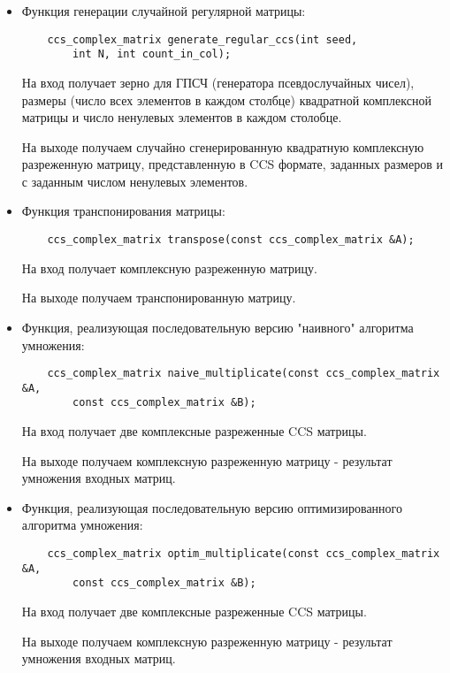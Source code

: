 \documentclass{report}
\begin{document}
		\begin{itemize}
			\item Функция генерации случайной регулярной матрицы:
			\begin{lstlisting}
    ccs_complex_matrix generate_regular_ccs(int seed, 
        int N, int count_in_col);
			\end{lstlisting}
			\par На вход получает зерно для ГПСЧ (генератора псевдослучайных чисел), размеры (число всех элементов в каждом столбце) квадратной комплексной матрицы и число ненулевых элементов в каждом столобце.
			\par На выходе получаем случайно сгенерированную квадратную комплексную разреженную матрицу, представленную в CCS формате, заданных размеров и с заданным числом ненулевых элементов.

			\item Функция транспонирования матрицы:
			\begin{lstlisting}
	ccs_complex_matrix transpose(const ccs_complex_matrix &A);
			\end{lstlisting}
			\par На вход получает комплексную разреженную матрицу.
			\par На выходе получаем транспонированную матрицу.

			\item Функция, реализующая последовательную версию "наивного"{} алгоритма умножения:
			\begin{lstlisting}
	ccs_complex_matrix naive_multiplicate(const ccs_complex_matrix &A, 
        const ccs_complex_matrix &B);
			\end{lstlisting}
			\par На вход получает две комплексные разреженные CCS матрицы. 
			\par На выходе получаем комплексную разреженную матрицу - результат умножения входных матриц.

			\item Функция, реализующая последовательную версию оптимизированного алгоритма умножения:
			\begin{lstlisting}
	ccs_complex_matrix optim_multiplicate(const ccs_complex_matrix &A, 
        const ccs_complex_matrix &B);
			\end{lstlisting}
			\par На вход получает две комплексные разреженные CCS матрицы. 
			\par На выходе получаем комплексную разреженную матрицу - результат умножения входных матриц.


\end{itemize}
\end{document}
